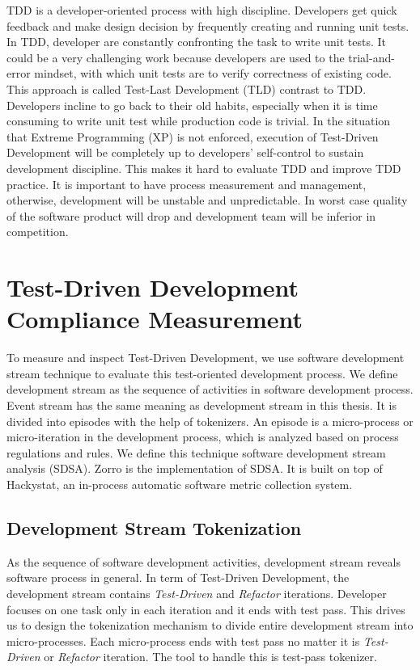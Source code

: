 TDD is a developer-oriented process with high discipline. Developers get
quick feedback and make design decision by frequently creating and running
unit tests. In TDD, developer are constantly confronting the task to write
unit tests. It could be a very challenging work because developers are used
to the trial-and-error mindset, with which unit tests are to verify
correctness of existing code. This approach is called Test-Last Development
(TLD) contrast to TDD. Developers incline to go back to their old habits,
especially when it is time consuming to write unit test while production
code is trivial. In the situation that Extreme Programming (XP) is not
enforced, execution of Test-Driven Development will be completely up to
developers' self-control to sustain development discipline. This makes it
hard to evaluate TDD and improve TDD practice. It is important to have 
process measurement and management, otherwise, development will be unstable 
and unpredictable\cite{Florac:99}. In worst case quality of the software 
product will drop and development team will be inferior in competition.

\section{Test-Driven Development Compliance Measurement}
To measure and inspect Test-Driven Development, we use software development 
stream technique to evaluate this test-oriented development process. We define 
development stream as the sequence of activities in software development process. 
Event stream has the same meaning as development stream in this thesis. It is 
divided into episodes with the help of tokenizers. An episode is a 
micro-process or micro-iteration in the development process, which is analyzed 
based on process regulations and rules. We define this technique software 
development stream analysis (SDSA). Zorro is the implementation of SDSA. It is 
built on top of Hackystat, an in-process automatic software metric collection
system. 

\subsection{Development Stream Tokenization}
As the sequence of software development activities, development stream
reveals software process in general. In term of Test-Driven Development,
the development stream contains \textit{Test-Driven} and \textit{Refactor} 
iterations. Developer focuses on one task only in each iteration and it ends 
with test pass. This drives us to design the tokenization mechanism to divide 
entire development stream into micro-processes. Each micro-process ends with 
test pass no matter it is \textit{Test-Driven} or \textit{Refactor} iteration. 
The tool to handle this is test-pass tokenizer.

